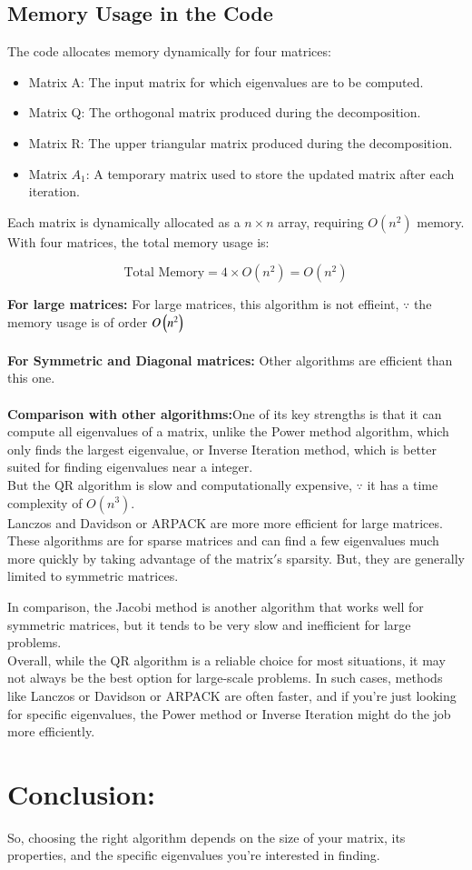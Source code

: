 \documentclass[journal,20pt,onecolumn]{IEEEtran}
\theoremstyle{remark}
\begin{document}
\subsection{Memory Usage in the Code}
The code allocates memory dynamically for four matrices:
\begin{itemize}
    \item Matrix  A: The input matrix for which eigenvalues are to be computed.
    \item Matrix  Q: The orthogonal matrix produced during the decomposition.
    \item Matrix  R: The upper triangular matrix produced during the decomposition.
    \item Matrix  $A_1$: A temporary matrix used to store the updated matrix after each iteration.
\end{itemize}

Each matrix is dynamically allocated as a \( n \times n \) array, requiring \( O(n^2) \) memory. With four matrices, the total memory usage is:

$$
\text{Total Memory} = 4 \times O(n^2) = O(n^2)
$$

\textbf{For large matrices:} For large matrices, this algorithm is not effieint, $\because$ the memory usage is of order $O\left(n^2\right)$\\ \\
     \textbf{For Symmetric and Diagonal matrices:} Other algorithms are efficient than this one.\\ \\
 \textbf{Comparison with other algorithms:}One of its key strengths is that it can compute all eigenvalues of a matrix, unlike the Power method algorithm, which only finds the largest eigenvalue, or Inverse Iteration method, which is better suited for finding eigenvalues near a integer.\\ 
      But the QR algorithm is slow and computationally expensive, $\because$ it has a time complexity of $O(n^3).$\\

Lanczos and Davidson or ARPACK are more more efficient for large matrices. These algorithms are for sparse matrices and can find a few eigenvalues much more quickly by taking advantage of the matrix$'$s sparsity. But, they are generally limited to symmetric matrices.

In comparison, the Jacobi method is another algorithm that works well for symmetric matrices, but it tends to be very slow and inefficient for large problems. \\Overall, while the QR algorithm is a reliable choice for most situations, it may not always be the best option for large-scale problems. In such cases, methods like Lanczos or Davidson or ARPACK are often faster, and if you're just looking for specific eigenvalues, the Power method or Inverse Iteration might do the job more efficiently. 
\section{Conclusion:}So, choosing the right algorithm depends on the size of your matrix, its properties, and the specific eigenvalues you're interested in finding.
\end{document}
